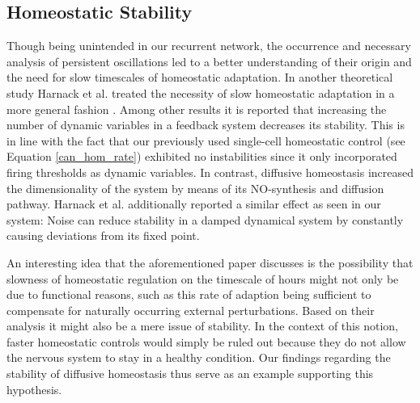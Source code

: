 \documentclass[10pt,a4paper]{article}
\begin{document}
\subsection{Homeostatic Stability}
Though being unintended in our recurrent network, the occurrence and necessary analysis of persistent oscillations led to a better understanding of their origin and the need for slow timescales of homeostatic adaptation. In another theoretical study Harnack et al. treated the necessity of slow homeostatic adaptation in a more general fashion \cite{Stability_Homeostasis_Harnack_2015}. Among other results it is reported that increasing the number of dynamic variables in a feedback system decreases its stability. This is in line with the fact that our previously used single-cell homeostatic control (see Equation \eqref{can_hom_rate}) exhibited no instabilities since it only incorporated firing thresholds as dynamic variables. In contrast, diffusive homeostasis increased the dimensionality of the system by means of its NO-synthesis and diffusion pathway. Harnack et al. additionally reported a similar effect as seen in our system: Noise can reduce stability in a damped dynamical system by constantly causing deviations from its fixed point.

An interesting idea that the aforementioned paper discusses is the possibility that slowness of homeostatic regulation on the timescale of hours might not only be due to functional reasons, such as this rate of adaption being sufficient to compensate for naturally occurring external perturbations. Based on their analysis it might also be a mere issue of stability. In the context of this notion, faster homeostatic controls would simply be ruled out because they do not allow the nervous system to stay in a healthy condition. Our findings regarding the stability of diffusive homeostasis thus serve as an example supporting this hypothesis.
\end{document}
